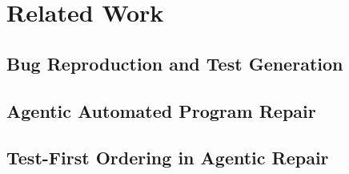 \chapter{Related Work}
\label{ch:related}

\section{Bug Reproduction and Test Generation}
\label{sec:related-brt}

\section{Agentic Automated Program Repair}
\label{sec:related-apr}

\section{Test-First Ordering in Agentic Repair}
\label{sec:related-ordering}


